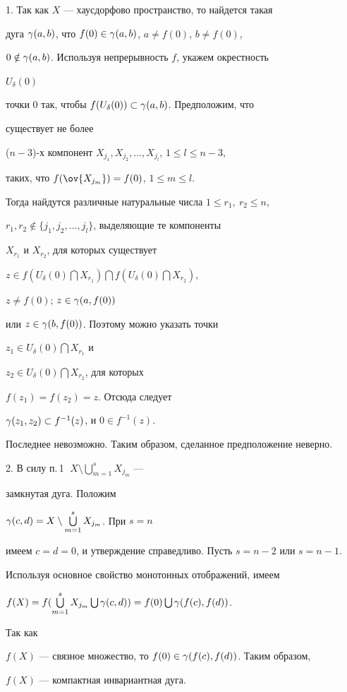 \begin{pf} 1. Так как $X$ --- хаусдорфово пространство, то найдется такая


дуга $\gamma (a,b)$, что $f(0)\in \gamma (a,b)$, $a\ne f(0)$, $b\ne f(0)$,


$0\notin\gamma (a,b)$. Используя непрерывность $f$, укажем окрестность


$U_{\delta}(0)$


точки $0$ так, чтобы $f(U_{\delta}(0))\subset \gamma (a,b)$. Предположим, что


существует не более


($n-3$)-х компонент $X_{j_1},X_{j_2},\dotsc,X_{j_l}$, $1\le l\le n-3$,


таких, что $f(\ov{X_{j_m}})=f(0)$, $1\le m\le l$.


Тогда найдутся различные натуральные числа $1\le r_1,\:r_2\le n$,


$r_1,r_2\notin \{j_1,j_2,\dotsc,j_l\}$, выделяющие те компоненты


$X_{r_1}$ и $X_{r_2}$, для которых существует


$z\in f(U_{\delta }(0)\bigcap X_{r_1})\bigcap f(U_{\delta }(0)\bigcap X_{r_2})$,


$z\ne f(0)$; $z\in \gamma (a,f(0))$


или $z\in \gamma (b,f(0))$. Поэтому можно указать точки


$z_1\in U_{\delta}(0)\bigcap X_{r_1}$ и


$z_2\in U_{\delta}(0)\bigcap X_{r_2}$, для которых


$f(z_1)=f(z_2)=z$. Отсюда следует


$\gamma (z_1, z_2) \subset f^{-1}(z)$, и $0\in f^{-1}(z)$.


Последнее невозможно. Таким образом, сделанное предположение неверно.





2. В силу п.\,1 $\;X\setminus \bigcup \limits_{m=1}^{s} X_{j_m}$ ---


замкнутая дуга. Положим


$\gamma (c,d)=X\setminus \bigcup \limits_{m=1}^{s} X_{j_m}$. При $s=n$


имеем $c=d=0$, и утверждение справедливо. Пусть $s=n-2$ или $s=n-1$.


Используя основное свойство монотонных отображений, имеем


$f(X)=f(\bigcup\limits_{m=1}^{s}X_{j_m}\bigcup\gamma(c,d))=f(0)\bigcup\gamma(f(c),f(d))$.


Так как


$f(X)$ --- связное множество, то $f(0)\in \gamma (f(c),f(d))$. Таким образом,


$f(X)$ --- компактная инвариантная дуга.


\end{pf}






